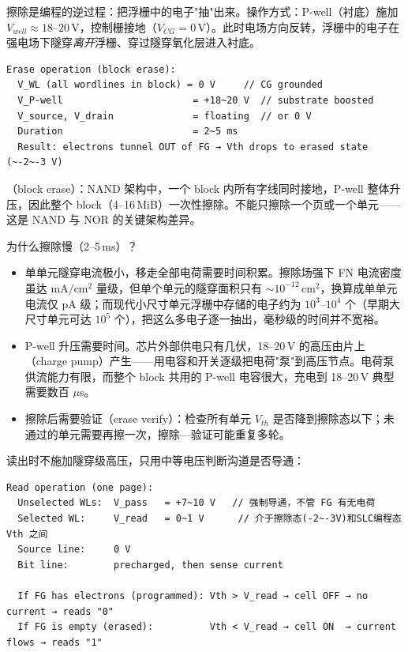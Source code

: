 擦除是编程的逆过程：把浮栅中的电子"抽"出来。操作方式：P-well（衬底）施加 $V_{well} \approx 18$--$20$\,V，控制栅接地（$V_{CG} = 0$\,V）。此时电场方向反转，浮栅中的电子在强电场下隧穿\emph{离开}浮栅、穿过隧穿氧化层进入衬底。

\begin{lstlisting}
Erase operation (block erase):
  V_WL (all wordlines in block) = 0 V     // CG grounded
  V_P-well                       = +18~20 V  // substrate boosted
  V_source, V_drain              = floating  // or 0 V
  Duration                       = 2~5 ms
  Result: electrons tunnel OUT of FG → Vth drops to erased state (~-2~-3 V)
\end{lstlisting}

（block erase）：NAND 架构中，一个 block 内所有字线同时接地，P-well 整体升压，因此整个 block（4--16\,MiB）一次性擦除。不能只擦除一个页或一个单元——这是 NAND 与 NOR 的关键架构差异。

为什么擦除慢（2--5\,ms）？
\begin{itemize}
  \item 单单元隧穿电流极小，移走全部电荷需要时间积累。擦除场强下 FN 电流密度虽达 $\mathrm{mA/cm^2}$ 量级，但单个单元的隧穿面积只有 $\sim$$10^{-12}$\,$\mathrm{cm^2}$，换算成单单元电流仅 pA 级；而现代小尺寸单元浮栅中存储的电子约为 $10^3$--$10^4$ 个（早期大尺寸单元可达 $10^5$ 个），把这么多电子逐一抽出，毫秒级的时间并不宽裕。
  \item P-well 升压需要时间。芯片外部供电只有几伏，18--20\,V 的高压由片上（charge pump）产生——用电容和开关逐级把电荷"泵"到高压节点。电荷泵供流能力有限，而整个 block 共用的 P-well 电容很大，充电到 18--20\,V 典型需要数百 $\mu$s。
  \item 擦除后需要验证（erase verify）：检查所有单元 $V_{th}$ 是否降到擦除态以下；未通过的单元需要再擦一次，擦除—验证可能重复多轮。
\end{itemize}



读出时不施加隧穿级高压，只用中等电压判断沟道是否导通：

\begin{lstlisting}
Read operation (one page):
  Unselected WLs:  V_pass   = +7~10 V   // 强制导通，不管 FG 有无电荷
  Selected WL:     V_read   = 0~1 V      // 介于擦除态(-2~-3V)和SLC编程态 Vth 之间
  Source line:     0 V
  Bit line:        precharged, then sense current

  If FG has electrons (programmed): Vth > V_read → cell OFF → no current → reads "0"
  If FG is empty (erased):          Vth < V_read → cell ON  → current flows → reads "1"
\end{lstlisting}

